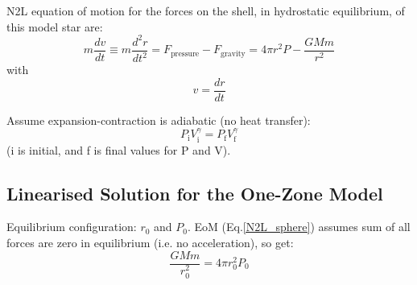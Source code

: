 \documentclass{spy}
\begin{document}
N2L equation of motion for the forces on the shell, in hydrostatic equilibrium, of this model star are:
\begin{equation}
    m\frac{dv}{dt} \equiv m\frac{d^2r}{dt^2}= F_\mathrm{pressure} - F_\mathrm{gravity} 
    = 4 \pi r^2 P - \frac{GMm}{r^2}
    \label{N2L_sphere}
\end{equation}
with
\begin{equation}
    v = \frac{dr}{dt}
    \label{vdrdt}
\end{equation}

Assume expansion-contraction is adiabatic (no heat transfer):
\begin{equation}
    P_\mathrm{i} V_\mathrm{i}^\gamma = P_\mathrm{f} V_\mathrm{f}^\gamma
    \label{adiabatic}
\end{equation}
(i is initial, and f is final values for P and V).



\subsection{Linearised Solution for the One-Zone Model}
Equilibrium configuration: \(r_\mathrm{0}\) and \(P_\mathrm{0}\).  EoM (Eq.\ref{N2L_sphere}) assumes sum of all forces are zero in equilibrium (i.e. no acceleration), so get: 
\begin{equation}
     \frac{GMm}{r^2_\mathrm{0}} = 4\pi r^2_\mathrm{0} P_\mathrm{0}
     \label{star_equilibrium}
\end{equation}
\end{document}
